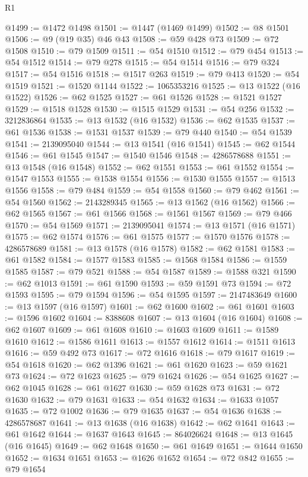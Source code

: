 \begin{lexlean}{R1}
\begin{coremodule}
@1499 := @1472 @1498
@1501 := @1447 (@1469 @1499)
@1502 := @8 @1501
@1506 := @9 (@19 @35) @46 @43
@1508 := @59 @428 @73
@1509 := @72 @1508
@1510 := @79 @1509
@1511 := @54 @1510
@1512 := @79 @454
@1513 := @54 @1512
@1514 := @79 @278
@1515 := @54 @1514
@1516 := @79 @324
@1517 := @54 @1516
@1518 := @1517 @263
@1519 := @79 @413
@1520 := @54 @1519
@1521 := @1520 @1144
@1522 := 1065353216
@1525 := @13 @1522 (@16 @1522)
@1526 := @62 @1525
@1527 := @61 @1526
@1528 := @1521 @1527
@1529 := @1518 @1528
@1530 := @1515 @1529
@1531 := @54 @256
@1532 := 3212836864
@1535 := @13 @1532 (@16 @1532)
@1536 := @62 @1535
@1537 := @61 @1536
@1538 := @1531 @1537
@1539 := @79 @440
@1540 := @54 @1539
@1541 := 2139095040
@1544 := @13 @1541 (@16 @1541)
@1545 := @62 @1544
@1546 := @61 @1545
@1547 := @1540 @1546
@1548 := 4286578688
@1551 := @13 @1548 (@16 @1548)
@1552 := @62 @1551
@1553 := @61 @1552
@1554 := @1547 @1553
@1555 := @1538 @1554
@1556 := @1530 @1555
@1557 := @1513 @1556
@1558 := @79 @484
@1559 := @54 @1558
@1560 := @79 @462
@1561 := @54 @1560
@1562 := 2143289345
@1565 := @13 @1562 (@16 @1562)
@1566 := @62 @1565
@1567 := @61 @1566
@1568 := @1561 @1567
@1569 := @79 @466
@1570 := @54 @1569
@1571 := 2139095041
@1574 := @13 @1571 (@16 @1571)
@1575 := @62 @1574
@1576 := @61 @1575
@1577 := @1570 @1576
@1578 := 4286578689
@1581 := @13 @1578 (@16 @1578)
@1582 := @62 @1581
@1583 := @61 @1582
@1584 := @1577 @1583
@1585 := @1568 @1584
@1586 := @1559 @1585
@1587 := @79 @521
@1588 := @54 @1587
@1589 := @1588 @321
@1590 := @62 @1013
@1591 := @61 @1590
@1593 := @59 @1591 @73
@1594 := @72 @1593
@1595 := @79 @1594
@1596 := @54 @1595
@1597 := 2147483649
@1600 := @13 @1597 (@16 @1597)
@1601 := @62 @1600
@1602 := @61 @1601
@1603 := @1596 @1602
@1604 := 8388608
@1607 := @13 @1604 (@16 @1604)
@1608 := @62 @1607
@1609 := @61 @1608
@1610 := @1603 @1609
@1611 := @1589 @1610
@1612 := @1586 @1611
@1613 := @1557 @1612
@1614 := @1511 @1613
@1616 := @59 @492 @73
@1617 := @72 @1616
@1618 := @79 @1617
@1619 := @54 @1618
@1620 := @62 @1396
@1621 := @61 @1620
@1623 := @59 @1621 @73
@1624 := @72 @1623
@1625 := @79 @1624
@1626 := @54 @1625
@1627 := @62 @1045
@1628 := @61 @1627
@1630 := @59 @1628 @73
@1631 := @72 @1630
@1632 := @79 @1631
@1633 := @54 @1632
@1634 := @1633 @1057
@1635 := @72 @1002
@1636 := @79 @1635
@1637 := @54 @1636
@1638 := 4286578687
@1641 := @13 @1638 (@16 @1638)
@1642 := @62 @1641
@1643 := @61 @1642
@1644 := @1637 @1643
@1645 := 864026624
@1648 := @13 @1645 (@16 @1645)
@1649 := @62 @1648
@1650 := @61 @1649
@1651 := @1644 @1650
@1652 := @1634 @1651
@1653 := @1626 @1652
@1654 := @72 @842
@1655 := @79 @1654

\end{coremodule}
\end{lexlean}

